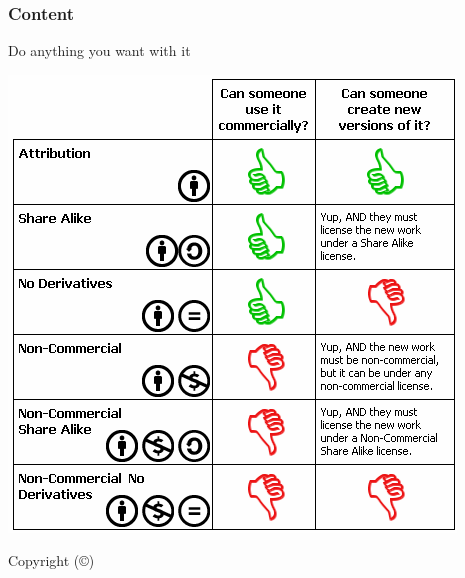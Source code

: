 \documentclass{beamer}
\begin{document}
\begin{frame}
  \frametitle{Content}
  \begin{center}
    \begin{large}Do anything you want with it \end{large}

    \includegraphics[height=0.7\textheight]{../img/cc-list}

    \begin{large}Copyright (\copyright) \end{large}
  \end{center}
\end{frame}
\end{document}
